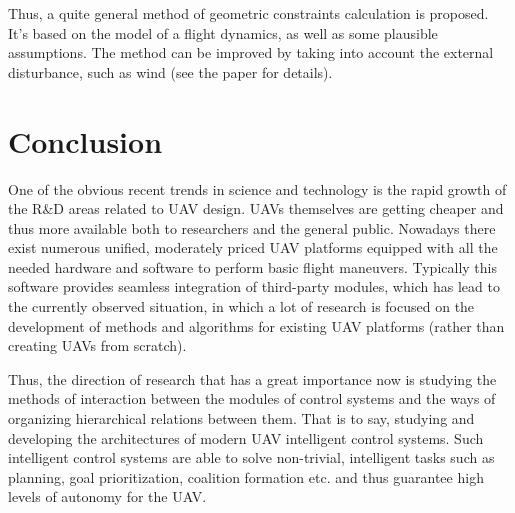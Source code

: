 \documentclass[review]{elsarticle}
\begin{document}
\begin{table}
	\caption{Calculated angle $\alpha$ for for different flight conditions.}	
	\label{tab:react_res}\scriptsize
\end{table}

Thus, a quite general method of geometric constraints calculation is proposed. It's based on the model of a flight dynamics, as well as some plausible assumptions. The method can be improved by taking into account the external disturbance, such as wind (see the paper \cite{Yakovlev2015a} for details).

\section{Conclusion}\label{sec:concl}

One of the obvious recent trends in science and technology is the rapid growth of the R\&D areas related to UAV design. UAVs themselves are getting cheaper and thus more available both to researchers and the general public. Nowadays there exist numerous unified, moderately priced UAV platforms equipped with all the needed hardware and software to perform basic flight maneuvers. Typically this software provides seamless integration of third-party modules, which has lead to the currently observed situation, in which a lot of research is focused on the development of methods and algorithms for existing UAV platforms (rather than creating UAVs from scratch). 

Thus, the direction of research that has a great importance now is studying the methods of interaction between the modules of control systems and the ways of organizing hierarchical relations between them. That is to say, studying and developing the architectures of modern UAV intelligent control systems. Such intelligent control systems are able to solve non-trivial, intelligent tasks such as planning, goal prioritization, coalition formation etc. and thus guarantee high levels of autonomy for the UAV. 
\end{document}
